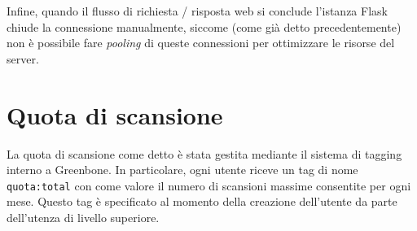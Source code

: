 Infine, quando il flusso di richiesta / risposta web si conclude l'istanza Flask chiude la connessione manualmente, siccome (come già detto precedentemente) non è possibile fare \emph{pooling} di queste connessioni per ottimizzare le risorse del server.

\section{Quota di scansione}
La quota di scansione come detto è stata gestita mediante il sistema di tagging interno a Greenbone. In particolare, ogni utente riceve un tag di nome \texttt{quota:total} con come valore il numero di scansioni massime consentite per ogni mese. Questo tag è specificato al momento della creazione dell'utente da parte dell'utenza di livello superiore.

